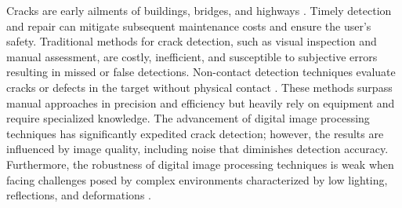 \documentclass[preprint,12pt,authoryear]{elsarticle}
\begin{document}







Cracks are early ailments of buildings, bridges, and highways \citep{hsieh_machine_2020}. Timely detection and repair can mitigate subsequent maintenance costs and ensure the user's safety. Traditional methods for crack detection, such as visual inspection and manual assessment, are costly, inefficient, and susceptible to subjective errors resulting in missed or false detections. Non-contact detection techniques evaluate cracks or defects in the target without physical contact \citep{ryuzono2022performance, wu2023learning, xia2023eddy}. These methods surpass manual approaches in precision and efficiency but heavily rely on equipment and require specialized knowledge. The advancement of digital image processing techniques has significantly expedited crack detection; however, the results are influenced by image quality, including noise that diminishes detection accuracy. Furthermore, the robustness of digital image processing techniques is weak when facing challenges posed by complex environments characterized by low lighting, reflections, and deformations \citep{munawar_image-based_2021}.
\end{document}
